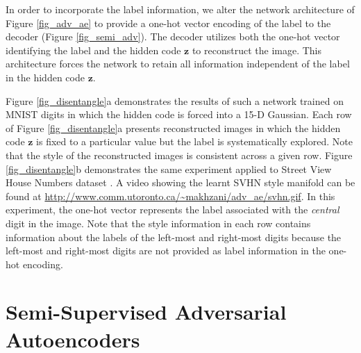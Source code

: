 \documentclass{article}
\begin{document}
In order to incorporate the label information, we alter the network architecture of Figure \ref{fig_adv_ae} to provide a one-hot vector encoding of the label to the decoder (Figure \ref{fig_semi_adv}).
The decoder utilizes both the one-hot vector identifying the label and the hidden code $\mathbf{z}$ to reconstruct the image.
This architecture forces the network to retain all information independent of the label in the hidden code $\mathbf{z}$. 



Figure \ref{fig_disentangle}a demonstrates the results of such a network trained on MNIST digits in which the hidden code is forced into a 15-D Gaussian.
Each row of Figure \ref{fig_disentangle}a presents reconstructed images in which the hidden code $\mathbf{z}$ is fixed to a particular value but the label is systematically explored.
Note that the style of the reconstructed images is consistent across a given row.
Figure \ref{fig_disentangle}b demonstrates the same experiment applied to Street View House Numbers dataset \citep{svhn}. A video showing the learnt SVHN style manifold can be found at \url{http://www.comm.utoronto.ca/~makhzani/adv_ae/svhn.gif}.
In this experiment, the one-hot vector represents the label associated with the \textit{central} digit in the image.
Note that the style information in each row contains information about the labels of the left-most and right-most digits because the left-most and right-most digits are not provided as label information in the one-hot encoding.


\section{Semi-Supervised Adversarial Autoencoders}\label{sec:semi-supervised}
\end{document}
